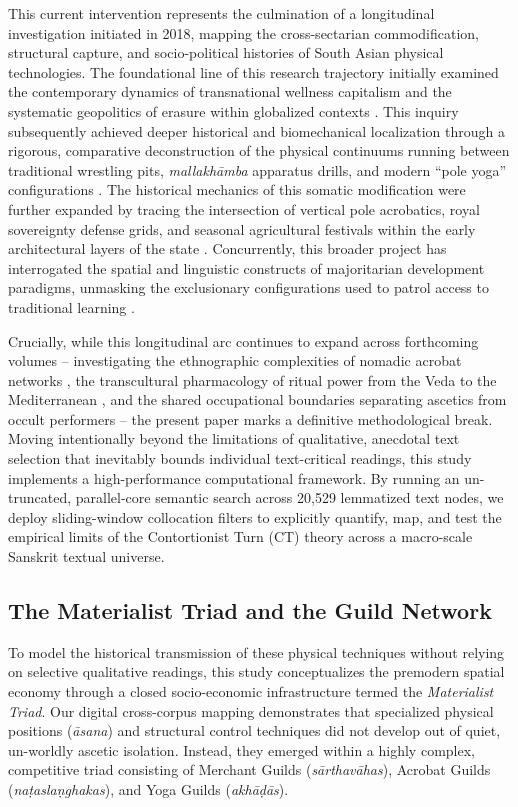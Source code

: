 \documentclass[11pt,twoside,letterpaper]{article}
\begin{document}
This current intervention represents the culmination of a longitudinal investigation initiated in 2018, mapping the cross-sectarian commodification, structural capture, and socio-political histories of South Asian physical technologies. The foundational line of this research trajectory initially examined the contemporary dynamics of transnational wellness capitalism and the systematic geopolitics of erasure within globalized contexts \citep{McCartney2021}. This inquiry subsequently achieved deeper historical and biomechanical localization through a rigorous, comparative deconstruction of the physical continuums running between traditional wrestling pits, \textit{mallakh\={a}mba} apparatus drills, and modern ``pole yoga'' configurations \citep{McCartney2023}. The historical mechanics of this somatic modification were further expanded by tracing the intersection of vertical pole acrobatics, royal sovereignty defense grids, and seasonal agricultural festivals within the early architectural layers of the state \citep{McCartney2025}. Concurrently, this broader project has interrogated the spatial and linguistic constructs of majoritarian development paradigms, unmasking the exclusionary configurations used to patrol access to traditional learning \citep{McCartney2026}. 

Crucially, while this longitudinal arc continues to expand across forthcoming volumes -- investigating the ethnographic complexities of nomadic acrobat networks \citep{McCartneyForthcomingDomingA}, the transcultural pharmacology of ritual power from the Veda to the Mediterranean \citep{McCartneyForthcomingDomingB}, and the shared occupational boundaries separating ascetics from occult performers \citep{McCartneyForthcomingDomingC} -- the present paper marks a definitive methodological break. Moving intentionally beyond the limitations of qualitative, anecdotal text selection that inevitably bounds individual text-critical readings, this study implements a high-performance computational framework. By running an un-truncated, parallel-core semantic search across 20,529 lemmatized text nodes, we deploy sliding-window collocation filters to explicitly quantify, map, and test the empirical limits of the Contortionist Turn (CT) theory across a macro-scale Sanskrit textual universe.


\subsection{The Materialist Triad and the Guild Network}
To model the historical transmission of these physical techniques without relying on selective qualitative readings, this study conceptualizes the premodern spatial economy through a closed socio-economic infrastructure termed the \textit{Materialist Triad}. Our digital cross-corpus mapping demonstrates that specialized physical positions (\textit{\={a}sana}) and structural control techniques did not develop out of quiet, un-worldly ascetic isolation. Instead, they emerged within a highly complex, competitive triad consisting of Merchant Guilds (\textit{s\={a}rthav\={a}has}), Acrobat Guilds (\textit{na\d{t}as}\text{/}\textit{la\d{n}ghakas}), and Yoga Guilds (\textit{akh\={a}\d{d}\={a}s}).
\end{document}
